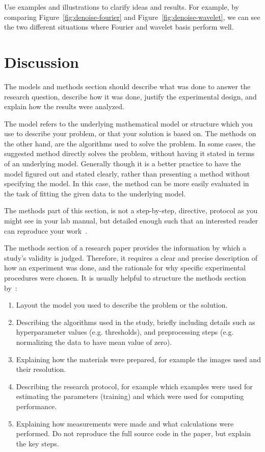 \documentclass[10pt,conference,compsocconf]{IEEEtran}
\begin{document}
Use examples and illustrations to clarify ideas and results. For
example, by comparing Figure~\ref{fig:denoise-fourier} and
Figure~\ref{fig:denoise-wavelet}, we can see the two different
situations where Fourier and wavelet basis perform well. 

\section{Discussion}
\label{sec:discussion}
The models and methods
section should describe what was
done to answer the research question, describe how it was done,
justify the experimental design, and
explain how the results were analyzed.

The model refers to the underlying mathematical model or structure which 
you use to describe your problem, or that your solution is based on. 
The methods on the other hand, are the algorithms used to solve the problem. 
In some cases, the suggested method directly solves the problem, without having it 
stated in terms of an underlying model. Generally though it is a better practice to have 
the model figured out and stated clearly, rather than presenting a method without specifying 
the model. In this case, the method can be more easily evaluated in the task of fitting 
the given data to the underlying model.

The methods part of this section, is not a step-by-step, directive,
protocol as you might see in your lab manual, but detailed enough such
that an interested reader can reproduce your
work~\cite{anderson04,wavelab}.

The methods section of a research paper provides the information by
which a study's validity is judged.
Therefore, it requires a clear and precise description of how an
experiment was done, and the rationale
for why specific experimental procedures were chosen.
It is usually helpful to
structure the methods section by~\cite{kallet04methods}:
\begin{enumerate}
\item Layout the model you used to describe the problem or the solution.
\item Describing the algorithms used in the study, briefly including
  details such as hyperparameter values (e.g. thresholds), and
  preprocessing steps (e.g. normalizing the data to have mean value of
  zero).
\item Explaining how the materials were prepared, for example the
  images used and their resolution.
\item Describing the research protocol, for example which examples
  were used for estimating the parameters (training) and which were
  used for computing performance.
\item Explaining how measurements were made and what
  calculations were performed. Do not reproduce the full source code in
  the paper, but explain the key steps.
\end{enumerate}
\end{document}
